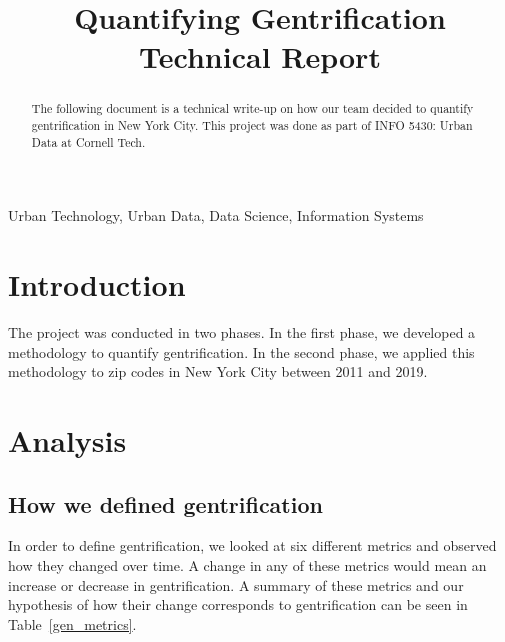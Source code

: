 \documentclass[conference]{IEEEtran}
\begin{document}
\title{Quantifying Gentrification Technical Report}

\author{
\and
{}
\and
{}
}

\maketitle

\begin{abstract}
The following document is a technical write-up on how our team decided to quantify gentrification in New York City. This project was done as part of INFO 5430: Urban Data at Cornell Tech. 
\end{abstract}

\begin{IEEEkeywords}
Urban Technology, Urban Data, Data Science, Information Systems
\end{IEEEkeywords}

\section{Introduction}
The project was conducted in two phases. In the first phase, we developed a methodology to quantify gentrification. In the second phase, we applied this methodology to zip codes in New York City between 2011 and 2019.

\section{Analysis}

\subsection{How we defined gentrification}
In order to define gentrification, we looked at six different metrics and observed how they changed over time. A change in any of these metrics would mean an increase or decrease in gentrification. A summary of these metrics and our hypothesis of how their change corresponds to gentrification can be seen in Table~\ref{gen_metrics}.
\end{document}
